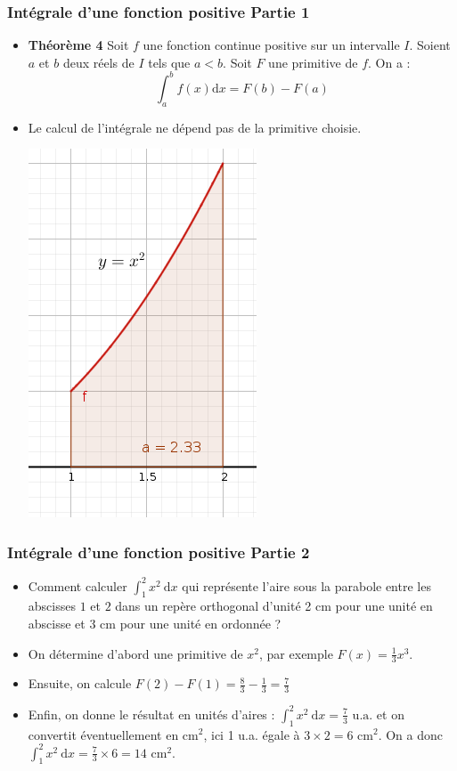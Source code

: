 \documentclass[11pt, hyperref={urlcolor=red,%
            linkcolor=blue, %
            colorlinks=true}]{beamer}
\newcommand{\dx}{\ensuremath{\text{d}x}}		%
\newcommand{\integralex}[3]{\int_{#1}^{#2} #3 \ \dx}
\begin{document}
\begin{frame}
\frametitle{Intégrale d'une fonction positive Partie 1}
\label{integrale}

\begin{itemize}
\item \textbf{Théorème 4 }  
Soit $f$ une fonction continue positive  sur un intervalle $I$. Soient $a$ et $b$ deux réels de $I$ tels que $a<b$. Soit $F$ une primitive de $f$. On a :\\
\[\displaystyle\int_{a}^{b}f(x)\dx=F(b)-F(a)\]

\pause \item \bcattention{} Le calcul de l'intégrale ne dépend pas de la primitive choisie.

\begin{center}
\includegraphics[scale=0.2]{ressources/parabole.png}
\end{center}

\end{itemize}

\end{frame}

 
\begin{frame}
\frametitle{Intégrale d'une fonction positive Partie 2}
\label{integrale}

\begin{itemize}
\item  Comment calculer $\integralex{1}{2}{x^{2}}$ qui représente l'aire sous la parabole entre les abscisses $1$ et $2$ dans un repère orthogonal d'unité 2 cm pour une unité en abscisse et 3 cm pour une unité en ordonnée ?
\pause \item On détermine d'abord une primitive de $x^{2}$, par exemple $F(x)=\frac{1}{3}x^{3}$. 
\pause \item Ensuite, on calcule $F(2)-F(1)=\frac{8}{3}-\frac{1}{3}=\frac{7}{3}$
\pause \item Enfin, on donne le résultat en unités d'aires :   $\integralex{1}{2}{x^{2}}=\frac{7}{3} \text{ u.a.}$
et on convertit éventuellement en cm$^{2}$, ici 1 u.a. égale à $3 \times 2 = 6 $ cm$^{2}$.
On a donc $\integralex{1}{2}{x^{2}}=\frac{7}{3} \times 6 = 14$ cm$^{2}$.
\end{itemize}

\end{frame}
\end{document}
